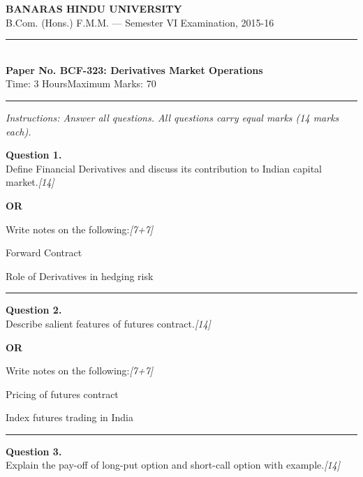 \documentclass[11pt,a4paper]{article}
\newcommand{\pts}[1]{\hfill   \textit{[#1]}}
\begin{document}
\begin{center}
  {\large\bfseries BANARAS HINDU UNIVERSITY}\\[2pt]
  {\normalsize B.Com. (Hons.) F.M.M. --- Semester VI Examination, 2015-16}\\[6pt]
  \rule{0.8\linewidth}{0.5pt}\\[6pt]
  {\large\bfseries Paper No. BCF-323: Derivatives Market Operations}\\[4pt]
  {\normalsize Time: 3 Hours\hfill Maximum Marks: 70}
\end{center}

\rule{\linewidth}{0.4pt}

\smallskip



\noindent   \textit{Instructions: Answer all questions. All questions carry equal marks (14 marks each).}

\bigskip




\noindent   \textbf{Question 1.} \\
Define Financial Derivatives and discuss its contribution to Indian capital market.\pts{14}

\centerline{   \textbf{OR}}

Write notes on the following:\pts{7+7}

\begin{parts}
  \item Forward Contract
  \item Role of Derivatives in hedging risk
\end{parts}

\medskip\rule{\linewidth}{0.2pt}




\noindent   \textbf{Question 2.} \\
Describe salient features of futures contract.\pts{14}

\centerline{   \textbf{OR}}

Write notes on the following:\pts{7+7}

\begin{parts}
  \item Pricing of futures contract
  \item Index futures trading in India
\end{parts}

\medskip\rule{\linewidth}{0.2pt}

\pagebreak




\noindent   \textbf{Question 3.} \\
Explain the pay-off of long-put option and short-call option with example.\pts{14}
\end{document}
